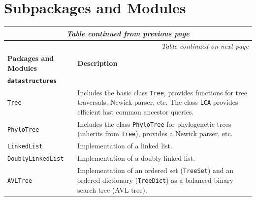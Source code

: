 \documentclass[hidelinks,11pt]{article}
\begin{document}
\appendix

\section{Subpackages and Modules}\label{apx:package_structure}

{\footnotesize
\setlength{\tabcolsep}{6pt}
\renewcommand{\arraystretch}{1.4}
\begin{longtable}{| p{4.0cm} | p{10cm} |}
	\endfirsthead
	\multicolumn{2}{c}{\textit{Table continued from previous page}}\\
	\hline
	\endhead
	\hline \multicolumn{2}{r}{\textit{Table continued on next page}} \\
	\endfoot
	\hline
	\endlastfoot
	\hline
	\textbf{Packages and Modules} & \textbf{Description} \\
  \hline
  \multicolumn{2}{|l|}{\textbf{\texttt{datastructures}}}\\
  \hline
  \texttt{Tree} &
  Includes the basic class \texttt{Tree}, provides functions for tree 
  traversals, Newick parser, etc. The class \texttt{LCA} provides efficient 
  last common ancestor queries.\\
  \texttt{PhyloTree} &
  Includes the class \texttt{PhyloTree} for phylogenetic trees (inherits from 
  \texttt{Tree}), provides a Newick parser, etc. \\
  \texttt{LinkedList} &
  Implementation of a linked list. \\
  \texttt{DoublyLinkedList} &
  Implementation of a doubly-linked list. \\
  \texttt{AVLTree} &
  Implementation of an ordered set (\texttt{TreeSet}) and an ordered dictionary 
  (\texttt{TreeDict}) as a balanced binary search tree (AVL tree). \\

\end{longtable}}
\end{document}
